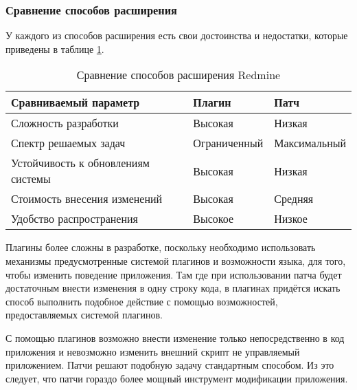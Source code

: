 \subsubsection{Сравнение способов расширения}
У каждого из способов расширения есть свои достоинства и недостатки, которые
приведены в таблице \ref{comparing_extensions}.
\begin{table}[hb!]

\makeatletter
\def\@makecaption#1#2{
  \vskip\abovecaptionskip
  \sbox\@tempboxa{#2 #1}
  \begin{flushright}
    #1
  \end{flushright}
  \begin{center}
    \textbf{#2}
  \end{center}
  \vskip\belowcaptionskip}
\makeatother

\caption{Сравнение способов расширения Redmine}
\small
\centering
\begin{tabular}{ 
|>{\centering\arraybackslash}m{}
|>{\centering\arraybackslash}m{}
|>{\centering\arraybackslash}m{}|}
\hline
\textbf{Сравниваемый параметр} & \textbf{Плагин} & \textbf{Патч}\\
\hline
Сложность разработки & Высокая & Низкая \\
\hline
Спектр решаемых задач & Ограниченный & Максимальный\\
\hline
Устойчивость к обновлениям системы & Высокая & Низкая \\
\hline
Стоимость внесения изменений & Высокая & Средняя \\
\hline
Удобство распространения & Высокое & Низкое \\
\hline
\end{tabular}

\label{comparing_extensions}
\end{table}

Плагины более сложны в разработке, поскольку необходимо использовать
механизмы предусмотренные системой плагинов и возможности языка, для того,
чтобы изменить поведение приложения. Там где при использовании патча будет
достаточным внести изменения в одну строку кода, в плагинах придётся искать
способ выполнить подобное действие с помощью возможностей, предоставляемых
системой плагинов.

С помощью плагинов возможно внести изменение только непосредственно в код
приложения и невозможно изменить внешний скрипт не управляемый приложением.
Патчи решают подобную задачу стандартным способом. Из это следует, что патчи
гораздо более мощный инструмент модификации приложения.

